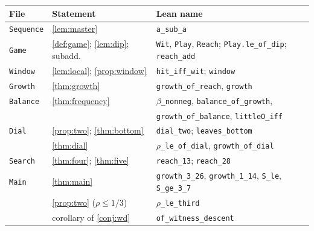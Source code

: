 \documentclass[11pt]{amsart}
\theoremstyle{definition}
\newcommand{\lean}[1]{\texttt{#1}}
\begin{document}
\begin{center}
\footnotesize
\setlength{\tabcolsep}{4pt}\begin{tabular}{@{}lll@{}}
\toprule
File & Statement & Lean name \\
\midrule
\lean{Sequence} & \cref{lem:master} & \lean{a\_sub\_a} \\
\lean{Game} & \cref{def:game}; \cref{lem:dip}; subadd. & \lean{Wit}, \lean{Play}, \lean{Reach}; \lean{Play.le\_of\_dip}; \lean{reach\_add} \\
\lean{Window} & \cref{lem:local}; \cref{prop:window} & \lean{hit\_iff\_wit}; \lean{window} \\
\lean{Growth} & \cref{thm:growth} & \lean{growth\_of\_reach}, \lean{growth} \\
\lean{Balance} & \cref{thm:frequency} & \lean{$\beta$\_nonneg}, \lean{balance\_of\_growth}, \\
 & & \lean{growth\_of\_balance}, \lean{littleO\_iff} \\
\lean{Dial} & \cref{prop:two}; \cref{thm:bottom} & \lean{dial\_two}; \lean{leaves\_bottom} \\
 & \cref{thm:dial} & \lean{$\rho$\_le\_of\_dial}, \lean{growth\_of\_dial} \\
\lean{Search} & \cref{thm:four}; \cref{thm:five} & \lean{reach\_13}; \lean{reach\_28} \\
\lean{Main} & \cref{thm:main} & \lean{growth\_3\_26}, \lean{growth\_1\_14}, \lean{S\_le}, \lean{S\_ge\_3\_7} \\
  & \cref{prop:two} ($\rho\le1/3$) & \lean{$\rho$\_le\_third} \\
 & corollary of \cref{conj:wd} & \lean{of\_witness\_descent} \\
\bottomrule
\end{tabular}
\end{center}



\end{document}

